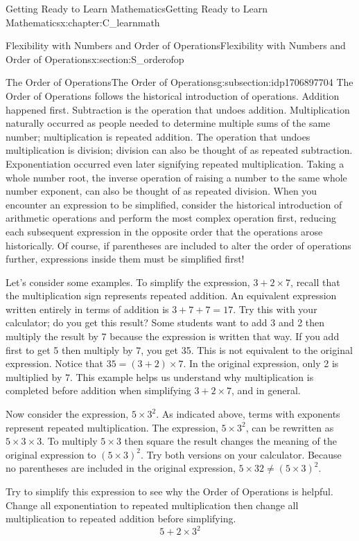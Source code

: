 \documentclass[oneside,10pt,]{book}
\numberwithin{equation}{chapter}
\begin{document}
\begin{chapterptx}{Getting Ready to Learn Mathematics}{}{Getting Ready to Learn Mathematics}{}{}{x:chapter:C_learnmath}
\begin{sectionptx}{Flexibility with Numbers and Order of Operations}{}{Flexibility with Numbers and Order of Operations}{}{}{x:section:S_orderofop}
\begin{subsectionptx}{The Order of Operations}{}{The Order of Operations}{}{}{g:subsection:idp1706897704}
The Order of Operations follows the historical introduction of operations. Addition happened first. Subtraction is the operation that undoes addition. Multiplication naturally occurred as people needed to determine multiple sums of the same number; multiplication is repeated addition. The operation that undoes multiplication is division; division can also be thought of as repeated subtraction. Exponentiation occurred even later signifying repeated multiplication. Taking a whole number root, the inverse operation of raising a number to the same whole number exponent, can also be thought of as repeated division. When you encounter an expression to be simplified, consider the historical introduction of arithmetic operations and perform the most complex operation first, reducing each subsequent expression in the opposite order that the operations arose historically. Of course, if parentheses are included to alter the order of operations further, expressions inside them must be simplified first!%
\par
Let's consider some examples. To simplify the expression, \(3 + 2 \times 7\), recall that the multiplication sign represents repeated addition. An equivalent expression written entirely in terms of addition is \(3 + 7 + 7 = 17\). Try this with your calculator; do you get this result? Some students want to add 3 and 2 then multiply the result by 7 because the expression is written that way. If you add first to get 5 then multiply by 7, you get 35. This is not equivalent to the original expression. Notice that \(35 = (3 + 2) \times 7\). In the original expression, only 2 is multiplied by 7. This example helps us understand why multiplication is completed before addition when simplifying \(3 + 2 \times 7\), and in general.%
\par
Now consider the expression, \(5 \times 3^2\). As indicated above, terms with exponents represent repeated multiplication. The expression, \(5 \times 3^2\), can be rewritten as \(5 \times 3 \times 3\). To multiply \(5 \times 3\) then square the result changes the meaning of the original expression to \((5 \times 3)^2\). Try both versions on your calculator. Because no parentheses are included in the original expression, \(5 \times 32 \ne (5 \times 3)^2\).%
\par
Try to simplify this expression to see why the Order of Operations is helpful. Change all exponentiation to repeated multiplication then change all multiplication to repeated addition before simplifying.%
\begin{equation*}
5 + 2 \times 3^2

\end{equation*}
\end{subsectionptx}
\end{sectionptx}
\end{chapterptx}
\end{document}
